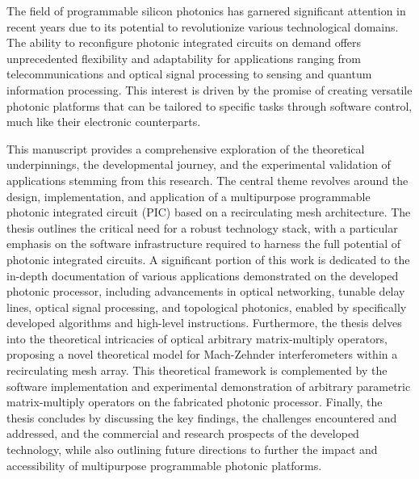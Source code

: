 %
%

The field of programmable silicon photonics has garnered significant attention in recent years due to its potential to revolutionize various technological domains.
The ability to reconfigure photonic integrated circuits on demand offers unprecedented flexibility and adaptability for applications ranging from telecommunications and optical signal processing to sensing and quantum information processing.
This interest is driven by the promise of creating versatile photonic platforms that can be tailored to specific tasks through software control, much like their electronic counterparts.

This manuscript provides a comprehensive exploration of the theoretical underpinnings, the developmental journey, and the experimental validation of applications stemming from this research.
The central theme revolves around the design, implementation, and application of a multipurpose programmable photonic integrated circuit (PIC) based on a recirculating mesh architecture.
The thesis outlines the critical need for a robust technology stack, with a particular emphasis on the software infrastructure required to harness the full potential of photonic integrated circuits.
A significant portion of this work is dedicated to the in-depth documentation of various applications demonstrated on the developed photonic processor, including advancements in optical networking, tunable delay lines, optical signal processing, and topological photonics, enabled by specifically developed algorithms and high-level instructions.
Furthermore, the thesis delves into the theoretical intricacies of optical arbitrary matrix-multiply operators, proposing a novel theoretical model for Mach-Zehnder interferometers within a recirculating mesh array.
This theoretical framework is complemented by the software implementation and experimental demonstration of arbitrary parametric matrix-multiply operators on the fabricated photonic processor.
Finally, the thesis concludes by discussing the key findings, the challenges encountered and addressed, and the commercial and research prospects of the developed technology, while also outlining future directions to further the impact and accessibility of multipurpose programmable photonic platforms.
